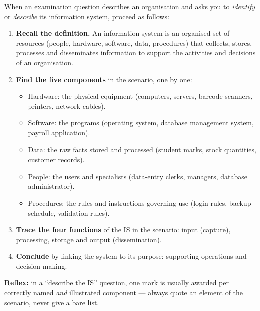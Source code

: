 \documentclass[11pt]{article}
\newcommand{\cle}[1]{{\popxbold\color{popdark}#1}}
\begin{document}
\begin{methode}
When an examination question describes an organisation and asks you to \emph{identify} or \emph{describe} its information system, proceed as follows:
\begin{enumerate}
\item \textbf{Recall the definition.} An information system is an organised set of resources (people, hardware, software, data, procedures) that collects, stores, processes and disseminates information to support the activities and decisions of an organisation.
\item \textbf{Find the five components} in the scenario, one by one:
\begin{itemize}
\item \cle{Hardware}: the physical equipment (computers, servers, barcode scanners, printers, network cables).
\item \cle{Software}: the programs (operating system, database management system, payroll application).
\item \cle{Data}: the raw facts stored and processed (student marks, stock quantities, customer records).
\item \cle{People}: the users and specialists (data-entry clerks, managers, database administrator).
\item \cle{Procedures}: the rules and instructions governing use (login rules, backup schedule, validation rules).
\end{itemize}
\item \textbf{Trace the four functions} of the IS in the scenario: \cle{input} (capture), \cle{processing}, \cle{storage} and \cle{output} (dissemination).
\item \textbf{Conclude} by linking the system to its purpose: supporting operations and \cle{decision-making}.
\end{enumerate}
\textbf{Reflex:} in a ``describe the IS'' question, one mark is usually awarded per correctly named \emph{and} illustrated component — always quote an element of the scenario, never give a bare list.
\end{methode}
\end{document}
